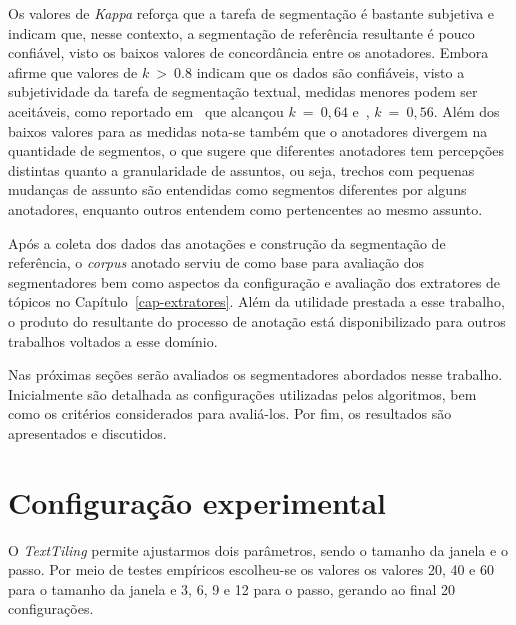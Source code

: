 Os valores de \textit{Kappa} reforça que a tarefa de segmentação é bastante subjetiva e indicam que, nesse contexto, a segmentação de referência resultante é pouco confiável, visto os baixos valores de concordância entre os anotadores. 
Embora~\cite{Carletta1996} afirme que valores de $k~>~0.8$ indicam que os dados são confiáveis, visto a subjetividade da tarefa de segmentação textual, medidas menores podem ser aceitáveis, como reportado em~\cite{Hearst1997} que alcançou $k~=~0,64$ e~\cite{Cardoso2017}, $k~=~0,56$. Além dos baixos valores para as medidas nota-se também que o anotadores divergem na quantidade de segmentos, o que sugere que diferentes anotadores tem percepções distintas quanto a granularidade de assuntos, ou seja, trechos com pequenas mudanças de assunto são entendidas como segmentos diferentes por alguns anotadores, enquanto outros entendem como pertencentes ao mesmo assunto.





Após a coleta dos dados das anotações e construção da segmentação de referência, o \textit{corpus} anotado serviu de como base para avaliação dos segmentadores bem como aspectos da configuração e avaliação dos extratores de tópicos no Capítulo~\ref{cap-extratores}. Além da utilidade prestada a esse trabalho, o produto do resultante do processo de anotação está disponibilizado para outros trabalhos voltados a esse domínio.

Nas próximas seções serão avaliados os segmentadores abordados nesse trabalho. Inicialmente são detalhada as configurações utilizadas pelos algoritmos, bem como os critérios considerados para avaliá-los. Por fim, os resultados são apresentados e discutidos.








\section{Configuração experimental}
\label{subsec:configuracaoexperimental}

  

O \textit{TextTiling} permite ajustarmos dois parâmetros, sendo o tamanho da janela e o passo. Por meio de testes empíricos escolheu-se os valores os valores 20, 40 e 60 para o tamanho da janela e 3, 6, 9 e 12 para o passo, gerando ao final 20 configurações.
%

